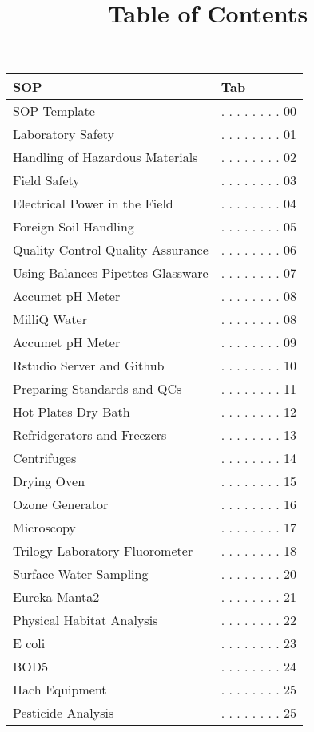 \documentclass[18pt]{memoir}\usepackage[]{graphicx}\usepackage[]{color}
\title{Table of Contents}
\begin{document}
\begin{table}[ht]
\centering
\begin{tabular}{ll}
  \toprule
SOP & Tab \\ 
  \midrule
SOP Template & . . . . . . . .  00 \\ 
  Laboratory Safety & . . . . . . . .  01 \\ 
  Handling of Hazardous Materials & . . . . . . . .  02 \\ 
  Field Safety & . . . . . . . .  03 \\ 
  Electrical Power in the Field & . . . . . . . .  04 \\ 
  Foreign Soil Handling & . . . . . . . .  05 \\ 
  Quality Control Quality Assurance & . . . . . . . .  06 \\ 
  Using Balances Pipettes Glassware & . . . . . . . .  07 \\ 
  Accumet pH Meter & . . . . . . . .  08 \\ 
  MilliQ Water & . . . . . . . .  08 \\ 
  Accumet pH Meter & . . . . . . . .  09 \\ 
  Rstudio Server and Github & . . . . . . . .  10 \\ 
  Preparing Standards and QCs & . . . . . . . .  11 \\ 
  Hot Plates Dry Bath & . . . . . . . .  12 \\ 
  Refridgerators and Freezers & . . . . . . . .  13 \\ 
  Centrifuges & . . . . . . . .  14 \\ 
  Drying Oven & . . . . . . . .  15 \\ 
  Ozone Generator & . . . . . . . .  16 \\ 
  Microscopy & . . . . . . . .  17 \\ 
  Trilogy Laboratory Fluorometer & . . . . . . . .  18 \\ 
  Surface Water Sampling & . . . . . . . .  20 \\ 
  Eureka Manta2 & . . . . . . . .  21 \\ 
  Physical Habitat Analysis & . . . . . . . .  22 \\ 
  E coli & . . . . . . . .  23 \\ 
  BOD5 & . . . . . . . .  24 \\ 
  Hach Equipment & . . . . . . . .  25 \\ 
   Pesticide Analysis & . . . . . . . .  25 \\ 

\end{tabular}
\end{table}
\end{document}
